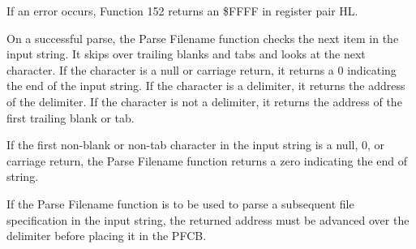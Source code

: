 If an error occurs, Function 152 returns an \$FFFF in register pair
HL.
  
On a successful parse, the Parse Filename function checks the next
item in the input string. It skips over trailing blanks and tabs and
looks at the next character. If the character is a null or carriage
return, it returns a 0 indicating the end of the input string. If the
character is a delimiter, it returns the address of the delimiter. If
the character is not a delimiter, it returns the address of the first
trailing blank or tab.

If the first non-blank or non-tab character in the input string is a
null, 0, or carriage return, the Parse Filename function returns a
zero indicating the end of string.

If the Parse Filename function is to be used to parse a subsequent
file specification in the input string, the returned address must be
advanced over the delimiter before placing it in the PFCB.

